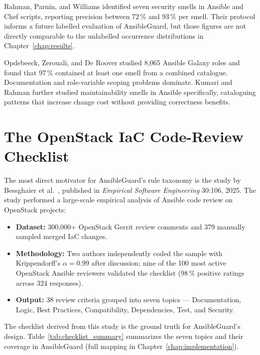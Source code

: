 \medskip\noindent
Rahman, Parnin, and Williams \cite{rahman2019security} identified seven security
smells in Ansible and Chef scripts, reporting precision between 72\,\% and
93\,\% per smell. Their protocol informs a future labelled evaluation of
AnsibleGuard, but those figures are not directly comparable to the unlabelled
occurrence distributions in Chapter~\ref{chap:results}.

\medskip\noindent
Opdebeeck, Zerouali, and De Roover \cite{opdebeeck2023ansible} studied 8,065
Ansible Galaxy roles and found that 97\,\% contained at least one smell from
a combined catalogue. Documentation and role-variable scoping problems dominate.
Kumari and Rahman \cite{kumari2021ansible} further studied maintainability smells
in Ansible specifically, cataloguing patterns that increase change cost without
providing correctness benefits.

\section{The OpenStack IaC Code-Review Checklist}
\label{sec:checklist_bg}

The most direct motivator for AnsibleGuard's rule taxonomy is the study by
Bessghaier et al.\ \cite{bessghaier2025iac}, published in \textit{Empirical
Software Engineering} 30:106, 2025. The study performed a large-scale empirical
analysis of Ansible code review on OpenStack projects:

\begin{itemize}
  \item \textbf{Dataset:} 300,000+ OpenStack Gerrit review comments and 379
        manually sampled merged \ac{IaC} changes.
  \item \textbf{Methodology:} Two authors independently coded the sample with
        Krippendorff's $\alpha = 0.99$ after discussion; nine of the 100 most
        active OpenStack Ansible reviewers validated the checklist (98\,\%
        positive ratings across 324 responses).
  \item \textbf{Output:} 38 review criteria grouped into seven topics —
        Documentation, Logic, Best Practices, Compatibility, Dependencies,
        Test, and Security.
\end{itemize}

\medskip\noindent
The checklist derived from this study is the ground truth for AnsibleGuard's
design. Table~\ref{tab:checklist_summary} summarizes the seven topics and their
coverage in AnsibleGuard (full mapping in Chapter~\ref{chap:implementation}).

